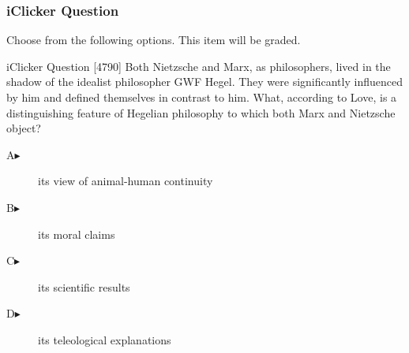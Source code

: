 \begin{frame}
  \frametitle{iClicker Question}
Choose from the following options. This item will be graded.
\begin{block}{iClicker Question}
  [4790] Both Nietzsche and Marx, as philosophers, lived in the shadow of the idealist philosopher GWF Hegel. They were significantly influenced by him and defined themselves in contrast to him. What, according to Love, is a distinguishing feature of Hegelian philosophy to which both Marx and Nietzsche object?
\end{block}
\begin{description}
\item[A\hspace{.2in}$\blacktriangleright$] its view of animal-human continuity
\item[B\hspace{.2in}$\blacktriangleright$] its moral claims
\item[C\hspace{.2in}$\blacktriangleright$] its scientific results
\item[D\hspace{.2in}$\blacktriangleright$] its teleological explanations
\end{description}
\end{frame}